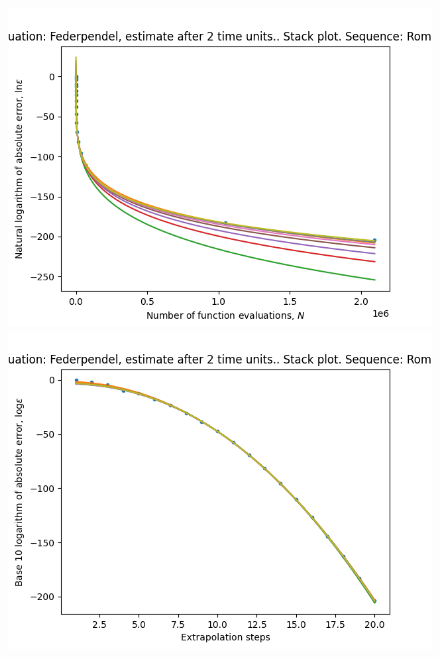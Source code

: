 \begin{figure}[H]
\centering
\begin{minipage}{0.45\textwidth}
\centering
\includegraphics[scale=0.45]{emr_plots/federpendel_2_hp_romberg_stack.png}
\end{minipage}
\begin{minipage}{0.45\textwidth}
\centering
\includegraphics[scale=0.45]{emr_plots/federpendel_2_hp_romberg_steps_stack.png}
\end{minipage}
\end{figure}

